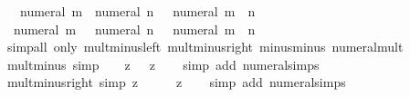 \begin{isabellebody}
\ \ {\isachardoublequoteopen}{\isacharminus}{\kern0pt}\ numeral\ m\ {\isacharasterisk}{\kern0pt}\ numeral\ n\ {\isacharequal}{\kern0pt}\ {\isacharminus}{\kern0pt}\ numeral\ {\isacharparenleft}{\kern0pt}m\ {\isacharasterisk}{\kern0pt}\ n{\isacharparenright}{\kern0pt}{\isachardoublequoteclose}\isanewline
\ \ {\isachardoublequoteopen}numeral\ m\ {\isacharasterisk}{\kern0pt}\ {\isacharminus}{\kern0pt}\ numeral\ n\ {\isacharequal}{\kern0pt}\ {\isacharminus}{\kern0pt}\ numeral\ {\isacharparenleft}{\kern0pt}m\ {\isacharasterisk}{\kern0pt}\ n{\isacharparenright}{\kern0pt}{\isachardoublequoteclose}\isanewline
%
\isadelimproof
\ \ %
\endisadelimproof
%
\isatagproof
{}\isamarkupfalse%
\ {\isacharparenleft}{\kern0pt}simp{\isacharunderscore}{\kern0pt}all\ only{\isacharcolon}{\kern0pt}\ mult{\isacharunderscore}{\kern0pt}minus{\isacharunderscore}{\kern0pt}left\ mult{\isacharunderscore}{\kern0pt}minus{\isacharunderscore}{\kern0pt}right\ minus{\isacharunderscore}{\kern0pt}minus\ numeral{\isacharunderscore}{\kern0pt}mult{\isacharparenright}{\kern0pt}%
\endisatagproof
{\isafoldproof}%
%
\isadelimproof
\isanewline
%
\endisadelimproof
\isanewline
{}\isamarkupfalse%
\ mult{\isacharunderscore}{\kern0pt}minus{}\ {\isacharbrackleft}{\kern0pt}simp{\isacharbrackright}{\kern0pt}{\isacharcolon}{\kern0pt}\ {\isachardoublequoteopen}{\isacharminus}{\kern0pt}\ {}\ {\isacharasterisk}{\kern0pt}\ z\ {\isacharequal}{\kern0pt}\ {\isacharminus}{\kern0pt}\ z{\isachardoublequoteclose}\isanewline
%
\isadelimproof
\ \ %
\endisadelimproof
%
\isatagproof
{}\isamarkupfalse%
\ {\isacharparenleft}{\kern0pt}simp\ add{\isacharcolon}{\kern0pt}\ numeral{\isachardot}{\kern0pt}simps{\isacharparenright}{\kern0pt}%
\endisatagproof
{\isafoldproof}%
%
\isadelimproof
\isanewline
%
\endisadelimproof
\isanewline
{}\isamarkupfalse%
\ mult{\isacharunderscore}{\kern0pt}minus{}{\isacharunderscore}{\kern0pt}right\ {\isacharbrackleft}{\kern0pt}simp{\isacharbrackright}{\kern0pt}{\isacharcolon}{\kern0pt}\ {\isachardoublequoteopen}z\ {\isacharasterisk}{\kern0pt}\ {\isacharminus}{\kern0pt}\ {}\ {\isacharequal}{\kern0pt}\ {\isacharminus}{\kern0pt}\ z{\isachardoublequoteclose}\isanewline
%
\isadelimproof
\ \ %
\endisadelimproof
%
\isatagproof
{}\isamarkupfalse%
\ {\isacharparenleft}{\kern0pt}simp\ add{\isacharcolon}{\kern0pt}\ numeral{\isachardot}{\kern0pt}simps{\isacharparenright}{\kern0pt}%
\endisatagproof
{\isafoldproof}%
%
\isadelimproof
\isanewline
%
\endisadelimproof
\isanewline
{}\isamarkupfalse%

\end{isabellebody}
